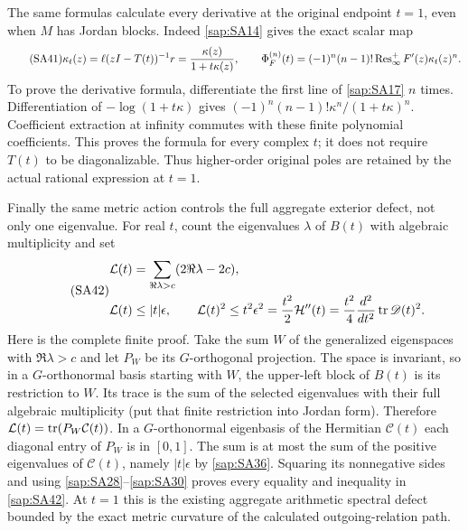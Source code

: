 \documentclass[11pt]{article}
\begin{document}
The same formulas calculate every derivative at the
original endpoint $t=1$, even when $M$ has Jordan blocks.
Indeed \eqref{sap:SA14} gives the exact scalar map
\begin{equation}\tag{SA41}\label{sap:SA41}
\kappa_t(z)=\ell(zI-T(t))^{-1}r
=\frac{\kappa(z)}{1+t\kappa(z)},\qquad
\Phi_F^{(n)}(t)=(-1)^n(n-1)!
\operatorname{Res}_\infty^+F'(z)\kappa_t(z)^n .
\end{equation}
To prove the derivative formula, differentiate the first
line of \eqref{sap:SA17} $n$ times. Differentiation of
$-\log(1+t\kappa)$ gives
$(-1)^n(n-1)!\kappa^n/(1+t\kappa)^n$.
Coefficient extraction at infinity commutes with these
finite polynomial coefficients. This proves the formula
for every complex $t$; it does not require $T(t)$ to be
diagonalizable. Thus higher-order original poles are
retained by the actual rational expression at $t=1$.

Finally the same metric action controls the full
aggregate exterior defect, not only one eigenvalue.
For real $t$, count the eigenvalues $\lambda$ of $B(t)$
with algebraic multiplicity and set
\begin{equation}\tag{SA42}\label{sap:SA42}
\begin{split}
\mathcal L(t)&=\sum_{\Re\lambda>c}
                   (2\Re\lambda-2c),\\
\mathcal L(t)&\leq |t|\epsilon,\qquad
\mathcal L(t)^2\leq
t^2\epsilon^2
=\frac{t^2}{2}\mathcal H''(t)
=\frac{t^2}{4}\frac{d^2}{dt^2}\operatorname{tr}\mathscr D(t)^2.
\end{split}
\end{equation}
Here is the complete finite proof. Take the sum $W$ of
the generalized eigenspaces with $\Re\lambda>c$ and
let $P_W$ be its $G$-orthogonal projection. The space
is invariant, so in a $G$-orthonormal basis starting
with $W$, the upper-left block of $B(t)$ is its
restriction to $W$. Its trace is the sum of the
selected eigenvalues with their full algebraic
multiplicity (put that finite restriction into Jordan
form). Therefore
$\mathcal L(t)=\operatorname{tr}(P_W\mathcal C(t))$.
In a $G$-orthonormal eigenbasis of the Hermitian
$\mathcal C(t)$ each diagonal entry of $P_W$ is in
$[0,1]$. The sum is at most the sum of the positive
eigenvalues of $\mathcal C(t)$, namely $|t|\epsilon$
by \eqref{sap:SA36}. Squaring its nonnegative sides and
using \eqref{sap:SA28}--\eqref{sap:SA30} proves every equality
and inequality in \eqref{sap:SA42}. At $t=1$ this is the
existing aggregate arithmetic spectral defect
bounded by the exact metric curvature of the
calculated outgoing-relation path.
\end{document}
